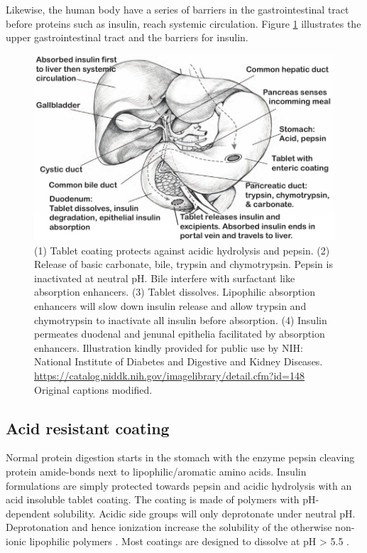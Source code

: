 Likewise, the human body have a series of barriers in the gastrointestinal tract before proteins such as insulin, reach systemic circulation. Figure \ref{intro_anatomy} illustrates the upper gastrointestinal tract and the barriers for insulin.

\begin{figure}[!htbp]
\includegraphics[width=\textwidth,height=\textheight,keepaspectratio]{graphics/intro_anatomy2.pdf}
\caption{(1) Tablet coating protects against acidic hydrolysis and pepsin. (2) Release of basic carbonate, bile, trypsin and chymotrypsin. Pepsin is inactivated at neutral pH. Bile interfere with surfactant like absorption enhancers. (3) Tablet dissolves. Lipophilic absorption enhancers will slow down insulin release and allow trypsin and chymotrypsin to inactivate all insulin before absorption. (4) Insulin permeates duodenal and jenunal epithelia facilitated by absorption enhancers. Illustration kindly provided for public use by NIH: National Institute of Diabetes and Digestive and Kidney Diseases. \url{https://catalog.niddk.nih.gov/imagelibrary/detail.cfm?id=148} Original captions modified.}
\label{intro_anatomy}
\end{figure}


\subsection{Acid resistant coating}
 Normal protein digestion starts in the stomach with the enzyme pepsin cleaving protein amide-bonds next to lipophilic/aromatic amino acids. Insulin formulations are simply protected towards pepsin and acidic hydrolysis with an acid insoluble tablet coating. The coating is made of polymers with pH-dependent solubility. Acidic side groups will only deprotonate under neutral pH. Deprotonation and hence ionization increase the solubility of the otherwise non-ionic lipophilic polymers \cite{carino1999oral,gabor2010improving}. Most coatings are designed to dissolve at pH > 5.5 \cite{maher2014formulation}.
 
